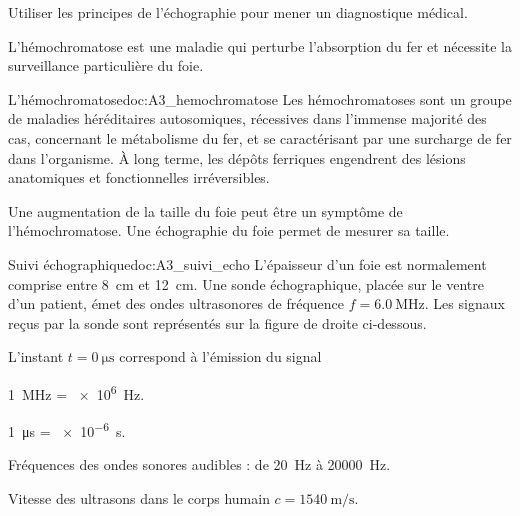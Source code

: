 \teteTermStssImag
{}


\begin{objectifs}
  \item Utiliser les principes de l'échographie pour mener un diagnostique médical.
\end{objectifs}

\begin{contexte}
  L’hémochromatose est une maladie qui perturbe l’absorption du fer et nécessite la surveillance particulière du foie.

\end{contexte}


\begin{doc}{L'hémochromatose}{doc:A3_hemochromatose}
  Les hémochromatoses sont un groupe de maladies héréditaires autosomiques, 
  récessives dans l'immense majorité des cas,
  concernant le métabolisme du fer,
  et se caractérisant par une surcharge de fer dans l'organisme.
  À long terme, les dépôts ferriques engendrent des lésions anatomiques et fonctionnelles irréversibles.
  
  Une augmentation de la taille du foie peut être un symptôme de l'hémochromatose.
  Une échographie du foie permet de mesurer sa taille.
\end{doc}


\begin{doc}{Suivi échographique}{doc:A3_suivi_echo}
  L’épaisseur d’un foie est normalement comprise entre \qty{8}{\cm} et \qty{12}{\cm}.
  Une sonde échographique, placée sur le ventre d’un patient,
  émet des ondes  ultrasonores de fréquence $f = \qty{6,0}{\mega\hertz}$.
  Les signaux reçus par la sonde sont représentés sur la figure de droite ci-dessous.

  \begin{center}
  \end{center}
  
  L’instant $t = \qty{0}{\micro\s}$ correspond à l’émission du signal

  \begin{donnees}
    \item \qty{1}{\mega\hertz} = \qty{e6}{\hertz}.
    \item \qty{1}{\micro\s} = \qty{e-6}{\s}.
    \item Fréquences des ondes sonores audibles : de \qty{20}{\hertz} à \qty{20000}{\hertz}.
    \item Vitesse des ultrasons dans le corps humain $c = \qty{1540}{\m\per\s}$.
  \end{donnees}
\end{doc}


